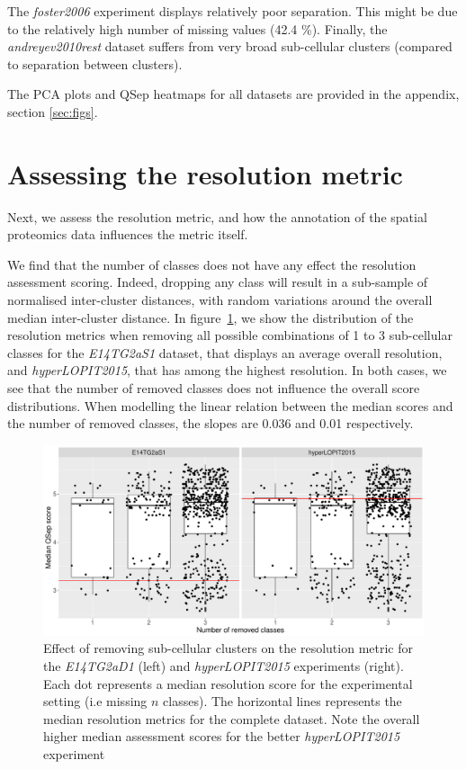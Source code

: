 \documentclass[12pt]{article}\usepackage[]{graphicx}\usepackage[]{color}
\begin{document}
The \textit{foster2006} experiment displays relatively poor
separation. This might be due to the relatively high number of missing
values (42.4 \%). Finally, the \textit{andreyev2010rest} dataset suffers from
very broad sub-cellular clusters (compared to separation between
clusters).


\bigskip

The PCA plots and QSep heatmaps for all datasets are provided in the
appendix, section \ref{sec:figs}.









\section{Assessing the resolution metric}\label{sec:qsepassess}

Next, we assess the resolution metric, and how the annotation of the
spatial proteomics data influences the metric itself.



We find that the number of classes does not have any effect the
resolution assessment scoring. Indeed, dropping any class will result
in a sub-sample of normalised inter-cluster distances, with random
variations around the overall median inter-cluster distance. In
figure~\ref{fig:simn}, we show the distribution of the resolution
metrics when removing all possible combinations of 1 to 3 sub-cellular
classes for the \textit{E14TG2aS1} dataset, that displays an average
overall resolution, and \textit{hyperLOPIT2015}, that has among the
highest resolution. In both cases, we see that the number of removed
classes does not influence the overall score distributions. When
modelling the linear relation between the median scores and the number
of removed classes, the slopes are 0.036 and
0.01 respectively.

\begin{figure}[h]
  \centering
  \includegraphics[width = .7\textwidth]{simn.pdf}
  \caption{Effect of removing sub-cellular clusters on the resolution
    metric for the \textit{E14TG2aD1} (left) and
    \textit{hyperLOPIT2015} experiments (right). Each dot represents a
    median resolution score for the experimental setting (i.e missing
    $n$ classes). The horizontal lines represents the median resolution
    metrics for the complete dataset. Note the overall higher median
    assessment scores for the better \textit{hyperLOPIT2015}
    experiment }
  \label{fig:simn}
\end{figure}
\end{document}
